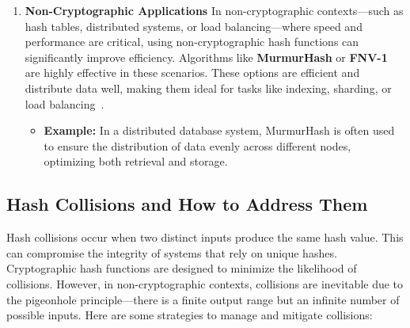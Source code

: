 \documentclass[11pt,a4paper]{article}
\begin{document}
\begin{enumerate}
\begin{itemize}
                \end{itemize}

            \item \textbf{Non-Cryptographic Applications} In non-cryptographic contexts—such as hash tables, distributed systems, or load balancing—where speed and performance are critical, using non-cryptographic hash functions can significantly improve efficiency. Algorithms like \textbf{MurmurHash} or \textbf{FNV-1} are highly effective in these scenarios. These options are efficient and distribute data well, making them ideal for tasks like indexing, sharding, or load balancing~\cite{non-Cryptographic}.
            \begin{itemize}
                \item \textbf{Example:} In a distributed database system, MurmurHash is often used to ensure the distribution of data evenly across different nodes, optimizing both retrieval and storage.


            \end{itemize}
        \end{enumerate}

    \subsection*{Hash Collisions and How to Address Them}
    Hash collisions occur when two distinct inputs produce the same hash value. This can compromise the integrity of systems that rely on unique hashes. Cryptographic hash functions are designed to minimize the likelihood of collisions. However, in non-cryptographic contexts, collisions are inevitable due to the pigeonhole principle—there is a finite output range but an infinite number of possible inputs. Here are some strategies to manage and mitigate collisions:
\end{document}
